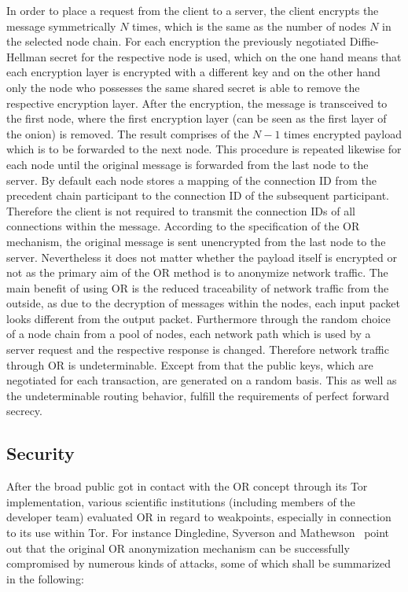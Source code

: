 \documentclass{sig-alternate}
\begin{document}
In order to place a request from the client to a server, the client encrypts the message symmetrically $N$ times, which is the same as the number of nodes $N$ in the selected node chain. For each encryption the previously negotiated Diffie-Hellman secret for the respective node is used, which on the one hand means that each encryption layer is encrypted with a different key and on the other hand only the node who possesses the same shared secret is able to remove the respective encryption layer.
After the encryption, the message is transceived to the first node, where the first encryption layer (can be seen as the first layer of the onion) is removed. The result comprises of the $N-1$ times encrypted payload which is to be forwarded to the next node. This procedure is repeated likewise for each node until the original message is forwarded from the last node to the server. By default each node stores a mapping of the connection ID from the precedent chain participant to the connection ID of the subsequent participant. Therefore the client is not required to transmit the connection IDs of all connections within the message. According to the specification of the OR mechanism, the original message is sent unencrypted from the last node to the server. Nevertheless it does not matter whether the payload itself is encrypted or not as the primary aim of the OR method is to anonymize network traffic.
The main benefit of using OR is the reduced traceability of network traffic from the outside, as due to the decryption of messages within the nodes, each input packet looks different from the output packet. Furthermore through the random choice of a node chain from a pool of nodes, each network path which is used by a server request and the respective response is changed. Therefore network traffic through OR is undeterminable. Except from that the public keys, which are negotiated for each transaction, are generated on a random basis. This as well as the undeterminable routing behavior, fulfill the requirements of perfect forward secrecy.~\cite{diffie1992authentication} 

\subsection{Security}

After the broad public got in contact with the OR concept through its Tor implementation, various scientific institutions (including members of the developer team) evaluated OR in regard to weakpoints, especially in connection to its use within Tor. For instance Dingledine, Syverson and Mathewson~\cite{dingledine2004tor} point out that the original OR anonymization mechanism can be successfully compromised by numerous kinds of attacks, some of which shall be summarized in the following:
\end{document}
